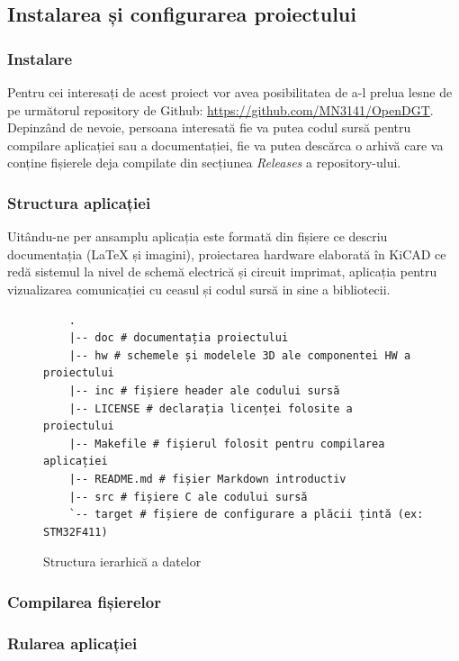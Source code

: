 \subsection{Instalarea și configurarea proiectului}

\subsubsection{Instalare}
Pentru cei interesați de acest proiect vor avea posibilitatea de a-l prelua lesne de pe următorul repository de Github: \url{https://github.com/MN3141/OpenDGT}. Depinzând de nevoie, persoana interesată fie va putea codul sursă pentru compilare aplicației sau a documentației, fie va putea descărca o arhivă care va conține fișierele deja compilate din secțiunea \textit{Releases} a repository-ului.

\subsubsection{Structura aplicației}

Uitându-ne per ansamplu aplicația este formată din fișiere ce descriu documentația (LaTeX și imagini), proiectarea hardware elaborată în KiCAD ce redă sistemul la nivel de schemă electrică și circuit imprimat, aplicația pentru vizualizarea comunicației cu ceasul și codul sursă in sine a bibliotecii.

\begin{figure}[H]
	\centering
\begin{verbatim}
	.
	|-- doc # documentația proiectului
	|-- hw # schemele și modelele 3D ale componentei HW a proiectului
	|-- inc # fișiere header ale codului sursă
	|-- LICENSE # declarația licenței folosite a proiectului
	|-- Makefile # fișierul folosit pentru compilarea aplicației
	|-- README.md # fișier Markdown introductiv
	|-- src # fișiere C ale codului sursă
	`-- target # fișiere de configurare a plăcii țintă (ex: STM32F411)
\end{verbatim}
\caption{Structura ierarhică a datelor}
\end{figure}

\subsubsection{Compilarea fișierelor}
\subsubsection{Rularea aplicației}